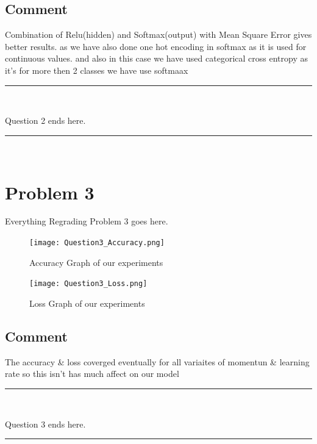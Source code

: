 \documentclass[paper=a4, fontsize=11pt]{scrartcl} %
\numberwithin{equation}{section} %
\numberwithin{figure}{section} %
\numberwithin{table}{section} %
\newcommand{\horrule}[1]{\rule{\linewidth}{#1}} %
\begin{document}
\subsection{Comment} 
Combination of Relu(hidden) and Softmax(output) with Mean Square Error gives better results. as  we have also done one hot encoding in softmax as it is used for continuous values. and also in this case we have used categorical cross entropy as it's for more then 2 classes we have use softmaax


\horrule{0.5pt} \\
\begin{center}
Question 2 ends here.
\horrule{2pt} \\
\end{center}


\pagebreak



\section{Problem 3}
Everything Regrading Problem 3 goes here.

\begin{figure}[h]
\begin{center}
\texttt{[image: Question3\_Accuracy.png]}
\end{center}
\caption{Accuracy Graph of our experiments}
\label{fig:demo}
\end{figure}



\pagebreak
\begin{figure}[h]
\begin{center}
\texttt{[image: Question3\_Loss.png]}
\end{center}
\caption{Loss Graph of our experiments}
\label{fig:demo}
\end{figure}

\subsection{Comment} 
 The accuracy \& loss coverged eventually for all variaites of momentun \& learning rate so this isn't has much affect on our model
\horrule{0.5pt} \\
\begin{center}
Question 3 ends here.
\horrule{2pt} \\
\end{center}
\end{document}
